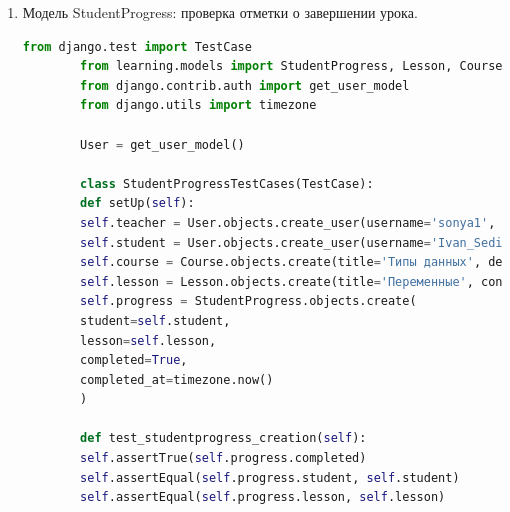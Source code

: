 \begin{enumerate}
\begin{lstlisting}[language=Python, caption=Модульный тест для TestResult, label=lst:testresult_test]
		User = get_user_model()
		
		class TestResultTestCases(TestCase):
		def setUp(self):
		self.teacher = User.objects.create_user(username='sonya1', password='vanya232323', is_teacher=True)
		self.student = User.objects.create_user(username='Ivan_Sedih', password='vanya232323', is_student=True)
		self.course = Course.objects.create(title='Объекты', description='Описание курса', creator=self.teacher)
		self.lesson = Lesson.objects.create(title='Создание объектов', content='Содержимое урока', order=1, course=self.course)
		self.test = Test.objects.create(title='Тест', passing_score=70, lesson=self.lesson)
		self.test_result = TestResult.objects.create(
		student=self.student,
		lesson=self.lesson,
		score=85,
		answers='{"q1": "a1"}',
		attempts=1,
		completed_at=timezone.now()
		)
		
		def test_testresult_creation(self):
		self.assertEqual(self.test_result.score, 85)
		self.assertEqual(self.test_result.student, self.student)
		self.assertEqual(self.test_result.lesson, self.lesson)
	\end{lstlisting}
	
	\item Модель StudentProgress: проверка отметки о завершении урока.
	\begin{lstlisting}[language=Python, caption=Модульный тест для StudentProgress, label=lst:studentprogress_test]
		from django.test import TestCase
		from learning.models import StudentProgress, Lesson, Course
		from django.contrib.auth import get_user_model
		from django.utils import timezone
		
		User = get_user_model()
		
		class StudentProgressTestCases(TestCase):
		def setUp(self):
		self.teacher = User.objects.create_user(username='sonya1', password='vanya232323', is_teacher=True)
		self.student = User.objects.create_user(username='Ivan_Sedih', password='vanya232323', is_student=True)
		self.course = Course.objects.create(title='Типы данных', description='Описание курса', creator=self.teacher)
		self.lesson = Lesson.objects.create(title='Переменные', content='Содержимое урока', order=1, course=self.course)
		self.progress = StudentProgress.objects.create(
		student=self.student,
		lesson=self.lesson,
		completed=True,
		completed_at=timezone.now()
		)
		
		def test_studentprogress_creation(self):
		self.assertTrue(self.progress.completed)
		self.assertEqual(self.progress.student, self.student)
		self.assertEqual(self.progress.lesson, self.lesson)
	\end{lstlisting}
	

\end{enumerate}
